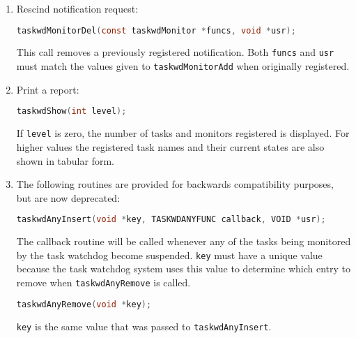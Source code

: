 \begin{enumerate}
\item Rescind notification request:

\begin{lstlisting}[language=C]
taskwdMonitorDel(const taskwdMonitor *funcs, void *usr);
\end{lstlisting}

This call removes a previously registered notification. Both \verb|funcs| and \verb|usr| must match the values given to 
\verb|taskwdMonitorAdd| when originally registered.

\item Print a report:

\begin{lstlisting}[language=C]
taskwdShow(int level);
\end{lstlisting}

If \verb|level| is zero, the number of tasks and monitors registered is displayed. For higher values the registered task 
names and their current states are also shown in tabular form.

\item The following routines are provided for backwards compatibility purposes, but are now deprecated:

\begin{lstlisting}[language=C]
taskwdAnyInsert(void *key, TASKWDANYFUNC callback, VOID *usr);
\end{lstlisting}

The callback routine will be called whenever any of the tasks being monitored by the task watchdog become 
suspended. \verb|key| must have a unique value because the task watchdog system uses this value to determine which 
entry to remove when \verb|taskwdAnyRemove| is called.

\begin{lstlisting}[language=C]
taskwdAnyRemove(void *key);
\end{lstlisting}

\verb|key| is the same value that was passed to \verb|taskwdAnyInsert|.
\end{enumerate}
